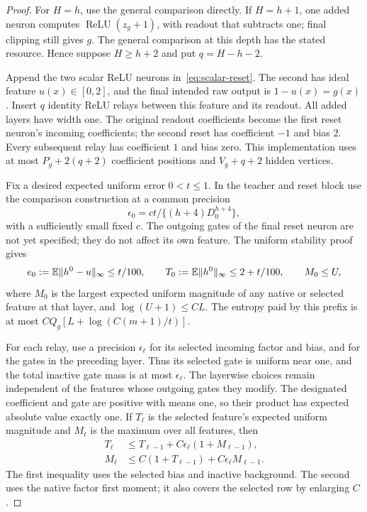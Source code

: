 \begin{proof}
For $H=h$, use the general comparison directly. If $H=h+1$, one added neuron computes $\operatorname{ReLU}(z_g+1)$, with readout that subtracts one; final clipping still gives $g$. The general comparison at this depth has the stated resource. Hence suppose $H\ge h+2$ and put $q=H-h-2$.

Append the two scalar ReLU neurons in~\eqref{eq:scalar-reset}. The second has ideal feature $u(x)\in[0,2]$, and the final intended raw output is $1-u(x)=g(x)$. Insert $q$ identity ReLU relays between this feature and its readout. All added layers have width one. The original readout coefficients become the first reset neuron's incoming coefficients; the second reset has coefficient $-1$ and bias $2$. Every subsequent relay has coefficient $1$ and bias zero. This implementation uses at most $P_g+2(q+2)$ coefficient positions and $V_g+q+2$ hidden vertices.

Fix a desired expected uniform error $0<t\le1$. In the teacher and reset block use the comparison construction at a common precision
\[
 \epsilon_0=ct\big/\{(h+4)D_0^{h+4}\},
\]
with a sufficiently small fixed $c$. The outgoing gates of the final reset neuron are not yet specified; they do not affect its own feature. The uniform stability proof gives
\[
 e_0:=\mathbb E\|h^0-u\|_\infty\le t/100,
 \qquad T_0:=\mathbb E\|h^0\|_\infty\le2+t/100,
 \qquad M_0\le U,
\]
where $M_0$ is the largest expected uniform magnitude of any native or selected feature at that layer, and $\log(U+1)\le CL$. The entropy paid by this prefix is at most
$CQ_g[L+\log(C(m+1)/t)]$.

For each relay, use a precision $\epsilon_\ell$ for its selected incoming factor and bias, and for the gates in the preceding layer. Thus its selected gate is uniform near one, and the total inactive gate mass is at most $\epsilon_\ell$. The layerwise choices remain independent of the features whose outgoing gates they modify. The designated coefficient and gate are positive with means one, so their product has expected absolute value exactly one. If $T_\ell$ is the selected feature's expected uniform magnitude and $M_\ell$ is the maximum over all features, then
\begin{align}
 T_\ell&\le T_{\ell-1}+C\epsilon_\ell(1+M_{\ell-1}),\\
 M_\ell&\le C(1+T_{\ell-1})+C\epsilon_\ell M_{\ell-1}.
 \label{eq:scalar-relay-moments}
\end{align}
The first inequality uses the selected bias and inactive background. The second uses the native factor first moment; it also covers the selected row by enlarging $C$.


\end{proof}
